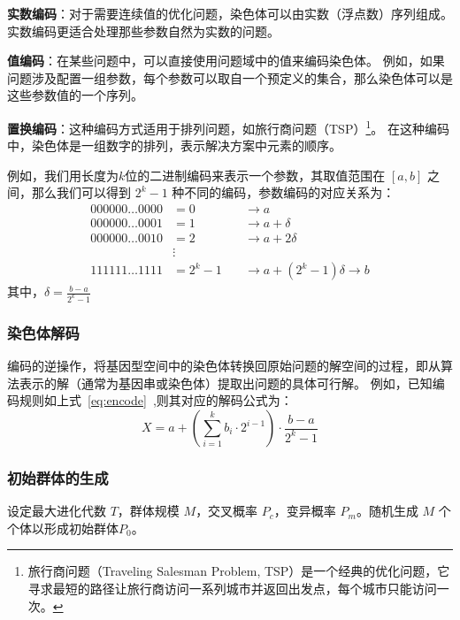     \textbf{实数编码}：对于需要连续值的优化问题，染色体可以由实数（浮点数）序列组成。实数编码更适合处理那些参数自然为实数的问题。

    \textbf{值编码}：在某些问题中，可以直接使用问题域中的值来编码染色体。
    例如，如果问题涉及配置一组参数，每个参数可以取自一个预定义的集合，那么染色体可以是这些参数值的一个序列。

    \textbf{置换编码}：这种编码方式适用于排列问题，如旅行商问题（TSP）\footnote{旅行商问题（Traveling Salesman Problem, TSP）是一个经典的优化问题，它寻求最短的路径让旅行商访问一系列城市并返回出发点，每个城市只能访问一次。}。
    在这种编码中，染色体是一组数字的排列，表示解决方案中元素的顺序。

    例如，我们用长度为$k$位的二进制编码来表示一个参数，其取值范围在 $[a, b]$ 之间，那么我们可以得到 $2^k−1$ 种不同的编码，参数编码的对应关系为：
    \begin{equation}
      \label{eq:encode}
      \begin{aligned}
        000000\dots0000 &= 0 \quad &\rightarrow a \\
        000000\dots0001 &= 1 \quad &\rightarrow a + \delta \\
        000000\dots0010 &= 2 \quad &\rightarrow a + 2\delta \\
        &\vdots \\
        111111\dots1111 &= 2^k - 1 \quad &\rightarrow a + (2^k - 1)\delta \rightarrow b
      \end{aligned}
    \end{equation}    
    其中，$\delta = \frac{b-a}{2^k - 1}$

    \subsubsection*{染色体解码}
    编码的逆操作，将基因型空间中的染色体转换回原始问题的解空间的过程，即从算法表示的解（通常为基因串或染色体）提取出问题的具体可行解。
    例如，已知编码规则如上式~\ref{eq:encode}~,则其对应的解码公式为：
    \begin{equation}
      \label{eq:decode}
      X = a + (\sum\limits_{i=1}^{k}b_i \cdot 2^{i-1}) \cdot \frac{b-a}{2^k-1}
    \end{equation}

\subsubsection*{初始群体的生成}

设定最大进化代数 \(T\)，群体规模 \(M\)，交叉概率 \(P_c\)，变异概率 \(P_m\)。随机生成 \(M\) 个个体以形成初始群体\(P_0\)。

